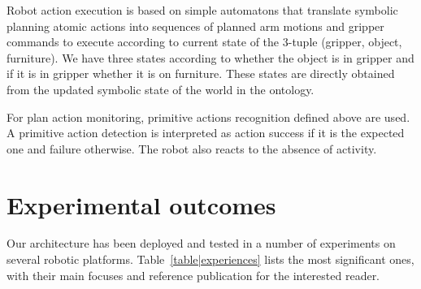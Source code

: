 \documentclass[preprint,5p]{elsarticle}
\begin{document}
Robot action execution is based on simple automatons  that translate
symbolic planning atomic actions into sequences of planned arm motions
and gripper commands to execute according to current state
of the 3-tuple (gripper, object, furniture). We have three states
according to whether the object is in gripper and if it is in gripper
whether it is on furniture.  These states are directly obtained from
the updated symbolic state of the world in the ontology.

For plan action monitoring, primitive actions recognition defined
above are used. A primitive action detection is interpreted as action
success if it is the expected one and failure otherwise. The robot
also reacts to the absence of activity.










\section{Experimental outcomes}

Our architecture has been deployed and tested in a number of experiments on
several robotic platforms. Table~\ref{table|experiences} lists the most
significant ones, with their main focuses and reference publication for the
interested reader.
\end{document}
